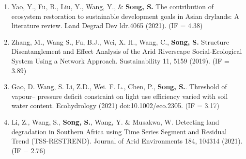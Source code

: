 \begin{paper}
\begin{enumerate}
	\item Yao, Y., Fu, B., Liu, Y., Wang, Y., \& \textbf{Song, S.} The contribution of ecosystem restoration to sustainable development goals in Asian drylands: A literature review. Land Degrad Dev ldr.4065 (2021). (IF = 4.38)
	\item Zhang, M., Wang S., Fu, B.J., Wei, X. H., Wang, C., \textbf{Song, S.} Structure Disentanglement and Effect Analysis of the Arid Riverscape Social-Ecological System Using a Network Approach. Sustainability 11, 5159 (2019). (IF = 3.89) 
	\item Gao, D. Wang, S. Li, Z.D., Wei. F. L., Chen, P., \textbf{Song, S.}. Threshold of vapour– pressure deficit constraint on light use efficiency varied with soil water content. Ecohydrology (2021) doi:10.1002/eco.2305. (IF = 3.17) 
	\item Li, Z., Wang, S., \textbf{Song, S.}, Wang, Y. \& Musakwa, W. Detecting land degradation in Southern Africa using Time Series Segment and Residual Trend (TSS-RESTREND). Journal of Arid Environments 184, 104314 (2021). (IF = 2.76) 

\end{enumerate}
\end{paper}
